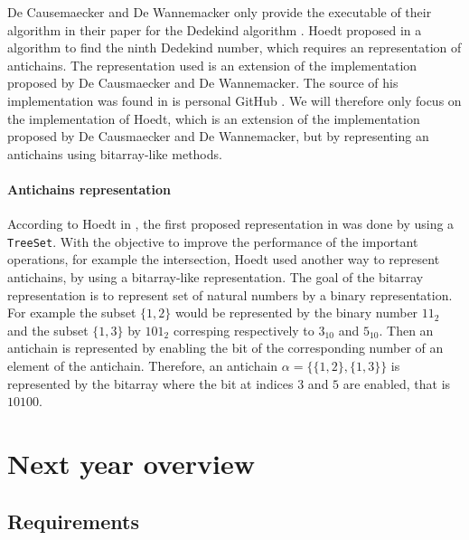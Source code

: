 \documentclass[letterpaper]{article}
\theoremstyle{definition}
\begin{document}
\label{sota_hoedts}

De Causemaecker and De Wannemacker only provide the executable of
their algorithm in their paper for
the Dedekind algorithm \cite{causemaecker1}. Hoedt proposed in \cite{hoedt}
a algorithm to find the ninth Dedekind number, which requires an representation
of antichains. The representation used is an extension of the implementation
proposed by De Causmaecker and De Wannemacker. The source of his
implementation was found in is personal GitHub \cite{hoedt_src}.
We will therefore only focus on the implementation
of Hoedt, which is an extension of the implementation proposed
by De Causmaecker and De Wannemacker, but by representing an antichains
using bitarray-like methods.

\paragraph{Antichains representation}

According to Hoedt in
\cite{hoedt}, the first proposed representation
in \cite{causemaecker1} was done by using
a \texttt{TreeSet}. With the objective to improve the performance of
the important operations, for example the intersection, Hoedt used
another way to represent antichains, by using a bitarray-like representation.
The goal of the bitarray representation is to represent set of natural numbers
by a binary representation. For example the subset $\{1, 2\}$ would be
represented by the binary number $11_2$ and the subset $\{1, 3\}$
by $101_2$ corresping respectively to $3_{10}$ and $5_{10}$. Then an antichain
is represented by enabling the bit of the corresponding number of an element
of the antichain. Therefore, an antichain $\alpha = \{\{1, 2\}, \{1, 3\}\}$
is represented by the bitarray  where the bit at indices $3$ and $5$
are enabled, that is $10100$.





\section{Next year overview}

\label{conclusion}

\subsection{Requirements}

\paragraph{}
\end{document}
